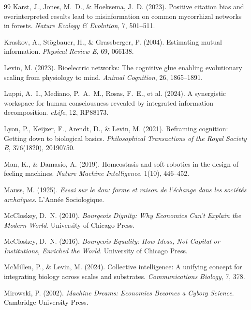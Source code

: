 \documentclass[11pt,a4paper,twocolumn]{article}
\begin{document}
\begin{thebibliography}{99}
 Karst, J., Jones, M.~D., \& Hoeksema, J.~D. (2023). Positive citation bias and overinterpreted results lead to misinformation on common mycorrhizal networks in forests. \textit{Nature Ecology \& Evolution}, 7, 501--511.

 Kraskov, A., St\"ogbauer, H., \& Grassberger, P. (2004). Estimating mutual information. \textit{Physical Review E}, 69, 066138.

 Levin, M. (2023). Bioelectric networks: The cognitive glue enabling evolutionary scaling from physiology to mind. \textit{Animal Cognition}, 26, 1865--1891.

 Luppi, A.~I., Mediano, P.~A.~M., Rosas, F.~E., et al. (2024). A synergistic workspace for human consciousness revealed by integrated information decomposition. \textit{eLife}, 12, RP88173.

 Lyon, P., Keijzer, F., Arendt, D., \& Levin, M. (2021). Reframing cognition: Getting down to biological basics. \textit{Philosophical Transactions of the Royal Society B}, 376(1820), 20190750.

 Man, K., \& Damasio, A. (2019). Homeostasis and soft robotics in the design of feeling machines. \textit{Nature Machine Intelligence}, 1(10), 446--452.

 Mauss, M. (1925). \textit{Essai sur le don: forme et raison de l'\'echange dans les soci\'et\'es archa\"iques}. L'Ann\'ee Sociologique.

 McCloskey, D.~N. (2010). \textit{Bourgeois Dignity: Why Economics Can't Explain the Modern World}. University of Chicago Press.

 McCloskey, D.~N. (2016). \textit{Bourgeois Equality: How Ideas, Not Capital or Institutions, Enriched the World}. University of Chicago Press.

 McMillen, P., \& Levin, M. (2024). Collective intelligence: A unifying concept for integrating biology across scales and substrates. \textit{Communications Biology}, 7, 378.

 Mirowski, P. (2002). \textit{Machine Dreams: Economics Becomes a Cyborg Science}. Cambridge University Press.


\end{thebibliography}
\end{document}
